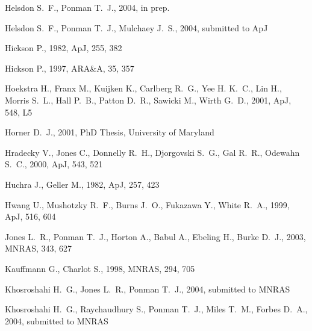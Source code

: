 \documentclass[usenatbib]{mn2e}
\begin{document}
\begin{thebibliography}{}
Helsdon S.~F.,  Ponman T.~J.,  2004, in prep.

Helsdon S.~F.,  Ponman T.~J.,    Mulchaey J.~S.,  2004, submitted to ApJ

Hickson P.,  1982, ApJ, 255, 382

Hickson P.,  1997, ARA\&A, 35, 357

Hoekstra H.,  Franx M.,  Kuijken K.,  Carlberg R.~G.,  Yee H. K.~C.,  Lin H.,
  Morris S.~L.,  Hall P.~B.,  Patton D.~R.,  Sawicki M.,    Wirth G.~D.,  2001,
  ApJ, 548, L5

Horner D.~J.,  2001, PhD Thesis, University of Maryland

Hradecky V.,  Jones C.,  Donnelly R.~H.,  Djorgovski S.~G.,  Gal R.~R.,
  Odewahn S.~C.,  2000, ApJ, 543, 521

Huchra J., Geller M.,  1982, ApJ, 257, 423

Hwang U.,  Mushotzky R.~F.,  Burns J.~O.,  Fukazawa Y.,    White R.~A.,  1999,
  ApJ, 516, 604

Jones L.~R.,  Ponman T.~J.,  Horton A.,  Babul A.,  Ebeling H.,    Burke D.~J.,
   2003, MNRAS, 343, 627

Kauffmann G.,  Charlot S.,  1998, MNRAS, 294, 705

Khosroshahi H.~G.,  Jones L.~R.,    Ponman T.~J.,  2004, submitted to MNRAS

Khosroshahi H.~G.,  Raychaudhury S.,  Ponman T.~J.,  Miles T.~M.,    Forbes
  D.~A.,  2004, submitted to MNRAS


\end{thebibliography}
\end{document}
